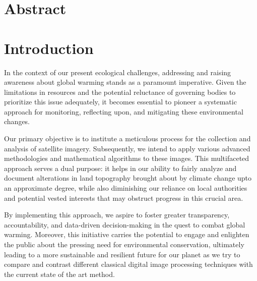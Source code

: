 \documentclass[12pt,a4paper,IEEEtran]{article}
\begin{document}
\setlength{\oddsidemargin}{0.25in}
\setlength{\textwidth}{6.5in}
\setlength{\topmargin}{0in}
\setlength{\textheight}{8.5in}








\newpage
\section{Abstract}

\section{Introduction}
In the context of our present ecological challenges, addressing and raising awareness about global warming stands as a paramount imperative. Given the limitations in resources and the potential reluctance of governing bodies to prioritize this issue adequately, it becomes essential to pioneer a systematic approach for monitoring, reflecting upon, and mitigating these environmental changes. 

Our primary objective is to institute a meticulous process for the collection and analysis of satellite imagery. Subsequently, we intend to apply various advanced methodologies and mathematical algorithms to these images. This multifaceted approach serves a dual purpose: it helps in our ability to fairly analyze and document alterations in land topography brought about by climate change upto an approximate degree, while also diminishing our reliance on local authorities and potential vested interests that may obstruct progress in this crucial area.

By implementing this approach, we aspire to foster greater transparency, accountability, and data-driven decision-making in the quest to combat global warming. Moreover, this initiative carries the potential to engage and enlighten the public about the pressing need for environmental conservation, ultimately leading to a more sustainable and resilient future for our planet as we try to compare and contrast different classical digital image processing techniques with the current state of the art method.
\end{document}

